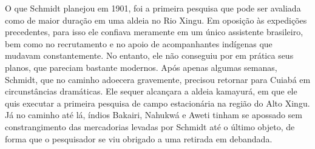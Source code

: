 
O que Schmidt planejou em 1901, foi a primeira pesquisa que pode ser
avaliada como de maior duração em uma aldeia no Rio Xingu. Em oposição
às expedições precedentes, para isso ele confiava meramente em um único
assistente brasileiro, bem como no recrutamento e no apoio de
acompanhantes indígenas que mudavam constantemente. No entanto, ele não
conseguiu por em prática seus planos, que pareciam bastante modernos.
Após apenas algumas semanas, Schmidt, que no caminho adoecera
gravemente, precisou retornar para Cuiabá em circunstâncias dramáticas.
Ele sequer alcançara a aldeia kamayurá, em que ele quis executar a
primeira pesquisa de campo estacionária na região do Alto Xingu. Já no
caminho até lá, índios Bakairi, Nahukwá e Aweti tinham se apossado sem
constrangimento das mercadorias levadas por Schmidt até o último objeto,
de forma que o pesquisador se viu obrigado a uma retirada em debandada.

